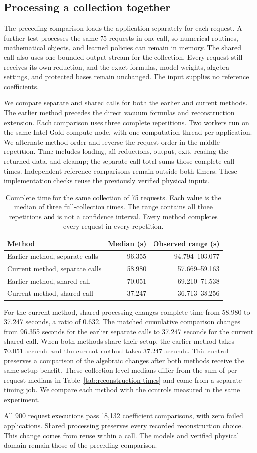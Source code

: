 \subsection{Processing a collection together}
\label{sec:batch-application}
The preceding comparison loads the application separately for each request. A further test processes the same 75 requests in one call, so numerical routines, mathematical objects, and learned policies can remain in memory. The shared call also uses one bounded output stream for the collection. Every request still receives its own reduction, and the exact formulas, model weights, algebra settings, and protected bases remain unchanged. The input supplies no reference coefficients.

We compare separate and shared calls for both the earlier and current methods. The earlier method precedes the direct vacuum formulas and reconstruction extension. Each comparison uses three complete repetitions. Two workers run on the same Intel Gold compute node, with one computation thread per application. We alternate method order and reverse the request order in the middle repetition. Time includes loading, all reductions, output, exit, reading the returned data, and cleanup; the separate-call total sums those complete call times. Independent reference comparisons remain outside both timers. These implementation checks reuse the previously verified physical inputs.

\begin{table}[htbp]
\centering\small
\caption{Complete time for the same collection of 75 requests. Each value is the median of three full-collection times. The range contains all three repetitions and is not a confidence interval. Every method completes every request in every repetition.}
\label{tab:batch-application}
\begin{tabular}{lrr}
\toprule
Method & Median (s) & Observed range (s)\\
\midrule
Earlier method, separate calls & 96.355 & 94.794--103.077 \\
Current method, separate calls & 58.980 & 57.669--59.163 \\
Earlier method, shared call & 70.051 & 69.210--71.538 \\
Current method, shared call & 37.247 & 36.713--38.256 \\
\bottomrule
\end{tabular}
\end{table}

For the current method, shared processing changes complete time from 58.980 to 37.247 seconds, a ratio of 0.632. The matched cumulative comparison changes from 96.355 seconds for the earlier separate calls to 37.247 seconds for the current shared call. When both methods share their setup, the earlier method takes 70.051 seconds and the current method takes 37.247 seconds. This control preserves a comparison of the algebraic changes after both methods receive the same setup benefit. These collection-level medians differ from the sum of per-request medians in Table~\ref{tab:reconstruction-times} and come from a separate timing job. We compare each method with the controls measured in the same experiment.

All 900 request executions pass 18,132 coefficient comparisons, with zero failed applications. Shared processing preserves every recorded reconstruction choice. This change comes from reuse within a call. The models and verified physical domain remain those of the preceding comparison.
